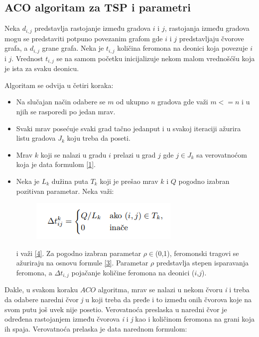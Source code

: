 \documentclass[a4paper]{article}
\begin{document}
\subsection{ACO algoritam za TSP i parametri}
\label{subsec:podnaslov1}

Neka $d_{i,j}$ predstavlja rastojanje između gradova $i$ i $j$, rastojanja između gradova mogu se predstaviti potpuno povezanim grafom gde $i$ i $j$ predstavljaju čvorove grafa, a  $d_{i,j}$ grane grafa. Neka je $t_{i,j}$ količina feromona na deonici koja povezuje $i$ i $j$. Vrednost $t_{i,j}$ se na samom početku inicijalizuje nekom malom vrednošćšu koja je ista za svaku deonicu.

\hfill \break
Algoritam se odvija u četiri koraka:
\begin{itemize}
\item Na slučajan način odabere se $m$ od ukupno $n$ gradova gde važi $m<=n$ i u njih se rasporedi po jedan mrav.
\item Svaki mrav posećuje svaki grad tačno jedanput i u svakoj iteraciji ažurira listu gradova $J_{k}$ koju treba da poseti.
\item Mrav $k$ koji se nalazi u gradu $i$ prelazi u grad $j$ gde 
$j \in J_{k}$ sa verovatnoćom koja je data formulom \ref{1}.

\item Neka je $L_{k}$ dužina puta $T_{k}$ koji je prešao mrav $k$ i $Q$ pogodno izabran pozitivan parametar. Neka važi: 

\begin{figure}[h!]
\begin{center}
\includegraphics[scale=0.5]{formula.png}
\end{center}
\label{fig:formula}
\end{figure}

i važi \ref{4}. Za pogodno izabran parametar $\rho \in$(0,1), feromonski tragovi se ažuriraju na osnovu formule \ref{3}. Parametar $\rho$ predstavlja stepen isparavanja feromona, a $\Delta t_{i,j}$ pojačanje količine feromona na deonici ($i$,$j$).

\end{itemize}

\hfill \break

Dakle, u svakom koraku $ACO$ algoritma, mrav se nalazi u nekom čvoru \textit{i} i treba da odabere naredni čvor \textit{j} u koji treba da pređe i to između onih čvorova koje na svom putu još uvek nije posetio. Verovatnoća preslaska u naredni čvor je određena rastojanjem između čvorova \textit{i} i \textit{j} kao i količinom feromona na grani koja ih spaja. Verovatnoća prelaska je data narednom formulom:
\end{document}
